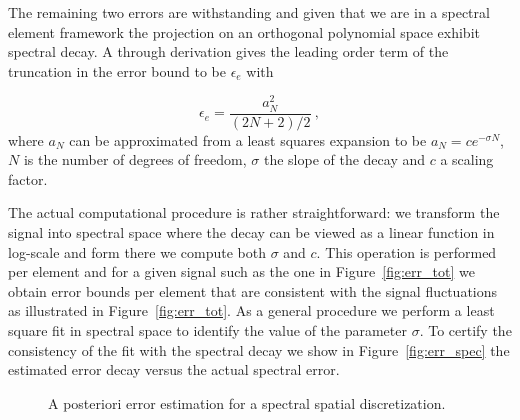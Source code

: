 \documentclass[10pt]{article}
\begin{document}
{The remaining two errors are withstanding and given that we are in a spectral element framework the projection on an orthogonal polynomial space exhibit spectral decay. A through derivation gives the leading order term of the truncation in the error bound to be $\epsilon_e$ with

$$\epsilon_e=\frac{a_N^2}{(2N+2)/2}\ , $$
where $a_N$ can be approximated from a least squares expansion to be $a_N=ce^{-\sigma N}$, $N$ is the number of degrees of freedom, $\sigma$ the slope of the decay and $c$ a scaling factor. 

The actual computational procedure is rather straightforward: we transform the signal into spectral space where the decay can be viewed as a linear function in log-scale and form there we compute both $\sigma$ and $c$.
This operation is performed per element and for a given signal such as the one in Figure~\ref{fig:err_tot} we obtain error bounds per element that are consistent with the signal fluctuations as illustrated in Figure~\ref{fig:err_tot}. As a general procedure we perform a least square fit in spectral space to identify the value of the parameter $\sigma$. To certify the consistency of the fit with the spectral decay we show in Figure~\ref{fig:err_spec} the estimated error decay versus the actual spectral error.




\begin{figure}[!ht]
\centering
{}
\quad
{}
\caption{A posteriori error estimation for a spectral spatial discretization.}
\end{figure}



}
\end{document}
